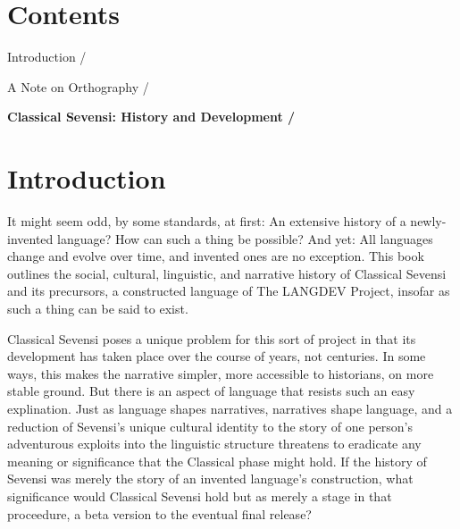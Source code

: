 
\chapter*{Contents}
\thispagestyle{empty}
\begin{table}[hbp]

\begin{small}

Introduction / \pageref{introduction}

\medskip

A Note on Orthography / \pageref{orthography}

\end{small}

\bigskip

\textbf{Classical Sevensi: History and Development / \pageref{text}}

\end{table}


\frontmatter
\chapter*{Introduction} \label{introduction}

It might seem odd, by some standards, at first: An extensive history of a newly-invented language?
How can such a thing be possible?
And yet: All languages change and evolve over time, and invented ones are no exception.
This book outlines the social, cultural, linguistic, and narrative history of Classical Sevensi and its precursors, a constructed language of The LANGDEV Project, insofar as such a thing can be said to exist.

Classical Sevensi poses a unique problem for this sort of project in that its development has taken place over the course of years, not centuries.
In some ways, this makes the narrative simpler, more accessible to historians, on more stable ground.
But there is an aspect of language that resists such an easy explination.
Just as language shapes narratives, narratives shape language, and a reduction of Sevensi's unique cultural identity to the story of one person's adventurous exploits into the linguistic structure threatens to eradicate any meaning or significance that the Classical phase might hold.
If the history of Sevensi was merely the story of an invented language's construction, what significance would Classical Sevensi hold but as merely a stage in that proceedure, a beta version to the eventual final release?

